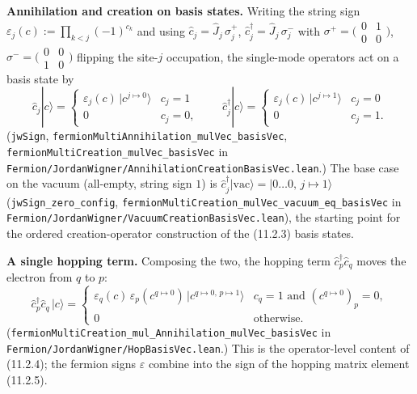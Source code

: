 \documentclass[a4paper,11pt]{article}
\begin{document}
\medskip
\noindent\textbf{Annihilation and creation on basis states.}
Writing the string sign \(\varepsilon_j(c) := \prod_{k<j}(-1)^{c_k}\) and using
\(\hat c_j = \hat J_j\,\sigma^+_j\), \(\hat c_j^\dagger = \hat J_j\,\sigma^-_j\)
with \(\sigma^+=\bigl(\begin{smallmatrix}0&1\\0&0\end{smallmatrix}\bigr)\),
\(\sigma^-=\bigl(\begin{smallmatrix}0&0\\1&0\end{smallmatrix}\bigr)\) flipping the
site-\(j\) occupation, the single-mode operators act on a basis state by
\[
  \hat c_j|c\rangle =
    \begin{cases}\varepsilon_j(c)\,|c^{j\mapsto0}\rangle & c_j=1\\ 0 & c_j=0,\end{cases}
  \qquad
  \hat c_j^\dagger|c\rangle =
    \begin{cases}\varepsilon_j(c)\,|c^{j\mapsto1}\rangle & c_j=0\\ 0 & c_j=1.\end{cases}
\]
(\texttt{jwSign}, \texttt{fermionMultiAnnihilation\_mulVec\_basisVec},
\texttt{fermionMultiCreation\_mulVec\_basisVec} in
\texttt{Fermion/JordanWigner/AnnihilationCreationBasisVec.lean}.)
The base case on the vacuum (all-empty, string sign \(1\)) is
\(\hat c_j^\dagger|\mathrm{vac}\rangle = |0\dots0,\,j\mapsto1\rangle\)
(\texttt{jwSign\_zero\_config},
\texttt{fermionMultiCreation\_mulVec\_vacuum\_eq\_basisVec} in
\texttt{Fermion/JordanWigner/VacuumCreationBasisVec.lean}), the starting point
for the ordered creation-operator construction of the (11.2.3) basis states.

\medskip
\noindent\textbf{A single hopping term.}
Composing the two, the hopping term \(\hat c_p^\dagger \hat c_q\) moves the
electron from \(q\) to \(p\):
\[
  \hat c_p^\dagger \hat c_q\,|c\rangle =
    \begin{cases}
      \varepsilon_q(c)\,\varepsilon_p(c^{q\mapsto0})\,
        |c^{q\mapsto0,\,p\mapsto1}\rangle
        & c_q = 1 \text{ and } (c^{q\mapsto0})_p = 0,\\
      0 & \text{otherwise.}
    \end{cases}
\]
(\texttt{fermionMultiCreation\_mul\_Annihilation\_mulVec\_basisVec} in
\texttt{Fermion/JordanWigner/HopBasisVec.lean}.) This is the operator-level
content of (11.2.4); the fermion signs \(\varepsilon\) combine into the
sign of the hopping matrix element (11.2.5).
\end{document}
